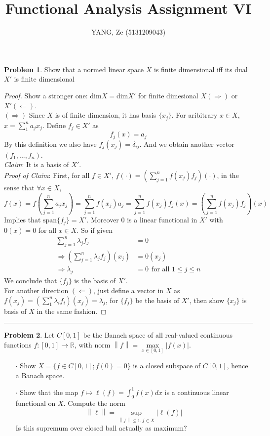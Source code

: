 \documentclass[a4paper, 10pt]{article}
\title{\textbf{Functional Analysis Assignment VI}}
\author{YANG, Ze (5131209043)}
\theoremstyle{definition}
\newtheorem{problem}{Problem}
\theoremstyle{hSol}
\begin{document}
\maketitle

\begin{problem} Show that a normed linear space $X$ is finite dimensional iff its dual $X'$ is finite dimensional
\end{problem}
\begin{proof} Show a stronger one: $\text{dim}X=\text{dim}X'$ for finite dimesional $X(\Rightarrow)$ or $X'(\Leftarrow)$. \\
$(\Rightarrow)$ Since $X$ is of finite dimension, it has basis $\{x_j\}$. For aribitrary $x\in X$, $x=\sum_1^n a_j x_j$. Define $f_j \in X'$ as
$$f_j(x)=a_j$$
By this definition we also have $f_j(x_j)=\delta_{ij}$. And we obtain another vector $(f_1,...,f_n)$. \\
\textit{Claim}: It is a basis of $X'$. \\
\textit{Proof of Claim}: First, for all $f\in X'$, $f(\cdot)=\left(\sum_{j=1}^n f(x_j) f_j\right)(\cdot)$, in the sense that $\forall x\in X$,
$$
f(x) = f\left(\sum_{j=1}^n a_j x_j\right) = \sum_{j=1}^n f(x_j) a_j = \sum_{j=1}^n f(x_j) f_j(x) = \left(\sum_{j=1}^n f(x_j) f_j\right)(x)
$$
Implies that $\text{span}\{f_j\} = X'$. 
Moreover $0$ is a linear functional in $X'$ with $0(x)=0$ for all $x\in X$. So if given
\begin{equation}
  \begin{split}
    \sum_{j=1}^n \lambda_j f_j &= 0 \\
    \Rightarrow \left(\sum_{j=1}^n \lambda_j f_j\right)(x_j) &= 0(x_j)\\
    \Rightarrow \lambda_j &= 0~~\text{for all }1\leq j\leq n
  \end{split}
\end{equation}
We conclude that $\{f_j\}$ is the basis of $X'$. \\
For another direction $(\Leftarrow)$, just define a vector in $X$ as $f(x_j)=(\sum_1^n \lambda_i f_i)(x_j)=\lambda_j$, for $\{f_j\}$ be the basis of $X'$, then show $\{x_j\}$ is basis of $X$ in the same fashion.
\end{proof}

\noindent\rule{16cm}{0.4pt}
\begin{problem} Let $C[0,1]$ be the Banach space of all real-valued continuous functions $f: [0,1]\to \mathbb{R}$, with norm $\left\|f\right\| = \max\limits_{x\in [0,1]}|f(x)|$.
\begin{itemize}
	\item[$\cdot$] Show $X=\{f\in C[0,1]; f(0)=0\}$ is a closed subspace of $C[0,1]$, hence a Banach space.
	\item[$\cdot$] Show that the map $f\mapsto \ell(f)=\int_0^1 f(x)dx$ is a continuous linear functional on $X$. Compute the norm
	$$\left\|\ell\right\| = \sup\limits_{\left\|f\right\|\leq 1, f\in X}|\ell(f)|$$
	Is this supremum over closed ball actually as maximum?
\end{itemize}
\end{problem}
\end{document}
